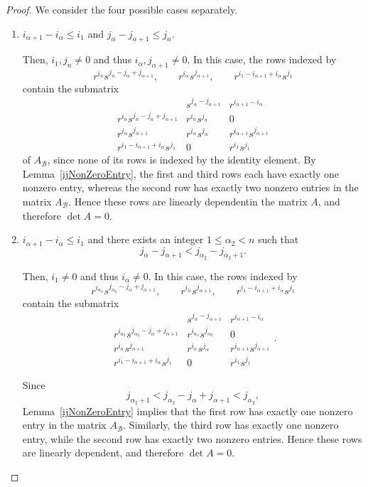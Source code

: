 \documentclass[11pt,reqno]{amsart}
\theoremstyle{plain}
\theoremstyle{remark}
\theoremstyle{definition}
\begin{document}
\begin{proof}
We consider the four possible cases separately.
\begin{enumerate}
\item $i_{\alpha+1}-i_\alpha\leq i_1$ and $j_\alpha-j_{\alpha+1}\leq j_n$.

Then, $i_1,j_n\neq 0$ and thus $i_\alpha, j_{\alpha+1}\neq 0$.
In this case, the rows indexed by
\[
r^{i_n}s^{j_n-j_\alpha+j_{\alpha+1}},
\qquad
r^{i_\alpha}s^{j_{\alpha+1}},
\qquad
r^{i_1-i_{\alpha+1}+i_\alpha}s^{j_1}
\]
contain the submatrix
\[
\begin{array}{c|cc}
& s^{j_\alpha-j_{\alpha+1}} & r^{i_{\alpha+1}-i_\alpha} \\ \hline
r^{i_n}s^{j_n-j_\alpha+j_{\alpha+1}}
& r^{i_n}s^{j_n} & 0 \\
r^{i_\alpha}s^{j_{\alpha+1}}
& r^{i_\alpha}s^{j_\alpha}
& r^{i_{\alpha+1}}s^{j_{\alpha+1}} \\
r^{i_1-i_{\alpha+1}+i_\alpha}s^{j_1}
& 0
& r^{i_1}s^{j_1}
\end{array}
\]
of $A_{\mathcal B}$, since none of its rows is indexed by the identity element.
By Lemma~\ref{ijNonZeroEntry}, the first and third rows each have exactly one nonzero entry, whereas the second row has exactly two nonzero entries in the matrix $A_{\mathcal B}$. Hence these rows are linearly dependentin the matrix $A$, and therefore $\det A=0$.

\item $i_{\alpha+1}-i_\alpha\leq i_1$ and there exists an integer $1\leq\alpha_2<n$ such that
\[
j_\alpha-j_{\alpha+1}
<
j_{\alpha_2}-j_{\alpha_2+1}.
\]

Then, $i_1\neq 0$ and thus $i_\alpha\neq 0$.
In this case, the rows indexed by
\[
r^{i_{\alpha_2}}s^{j_{\alpha_2}-j_\alpha+j_{\alpha+1}},
\qquad
r^{i_\alpha}s^{j_{\alpha+1}},
\qquad
r^{i_1-i_{\alpha+1}+i_\alpha}s^{j_1}
\]
contain the submatrix
\[
\begin{array}{c|cc}
& s^{j_\alpha-j_{\alpha+1}} & r^{i_{\alpha+1}-i_\alpha} \\ \hline
r^{i_{\alpha_2}}s^{j_{\alpha_2}-j_\alpha+j_{\alpha+1}}
& r^{i_{\alpha_2}}s^{j_{\alpha_2}} & 0 \\
r^{i_\alpha}s^{j_{\alpha+1}}
& r^{i_\alpha}s^{j_\alpha}
& r^{i_{\alpha+1}}s^{j_{\alpha+1}} \\
r^{i_1-i_{\alpha+1}+i_\alpha}s^{j_1}
& 0
& r^{i_1}s^{j_1}
\end{array}.
\]

Since
\[
j_{\alpha_2+1}
<
j_{\alpha_2}-j_\alpha+j_{\alpha+1}
<
j_{\alpha_2},
\]
Lemma~\ref{ijNonZeroEntry} implies that the first row has exactly one nonzero entry in the matrix $A_{\mathcal B}$. Similarly, the third row has exactly one nonzero entry, while the second row has exactly two nonzero entries. Hence these rows are linearly dependent, and therefore $\det A=0$.


\end{enumerate}
\end{proof}
\end{document}
